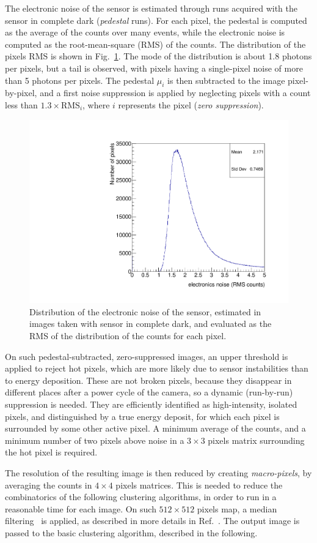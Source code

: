 The electronic noise of the sensor is estimated through runs acquired
with the sensor in complete dark ({\it pedestal} runs). For each
pixel, the pedestal is computed as the average of the counts over many
events, while the electronic noise is computed as the root-mean-square
(RMS) of the counts. The distribution of the pixels RMS is shown in
Fig.~\ref{fig:noise}. The mode of the distribution is about 1.8
photons per pixels, but a tail is observed, with pixels having a
single-pixel noise of more than 5 photons per pixels.
The pedestal $\mu_i$ is then subtracted to the image pixel-by-pixel,
and a first noise suppression is applied by neglecting pixels with a
count less than $1.3\times\textrm{RMS}_i$, where $i$ represents the
pixel (\textit{zero suppression}). 
%
\begin{figure}[ht]
  \centering
  \includegraphics[width=0.45\linewidth]{figures/sensor_noise}
  \caption{Distribution of the electronic noise of the sensor,
    estimated in images taken with sensor in complete dark, and
    evaluated as the RMS of the distribution of the counts for each
    pixel.  \label{fig:noise}}
\end{figure}
%
On such pedestal-subtracted, zero-suppressed images, an upper
threshold is applied to reject hot pixels, which are more likely due
to sensor instabilities than to energy deposition. These are not
broken pixels, because they disappear in different places after a
power cycle of the camera, so a dynamic (run-by-run) suppression is
needed.  They are efficiently identified as high-intensity, isolated
pixels, and distinguished by a true energy deposit, for which each
pixel is surrounded by some other active pixel. A minimum average of
the counts, and a minimum number of two pixels above noise in a
$3\times3$ pixels matrix surrounding the hot pixel is required.

The resolution of the resulting image is then reduced by creating
\textit{macro-pixels}, by averaging the counts in $4\times4$ pixels
matrices. This is needed to reduce the combinatorics of the following
clustering algorithms, in order to run in a reasonable time for each
image. On such $512\times512$ pixels map, a median
filtering~\cite{medianfilter} is applied, as described in more details
in Ref.~\cite{medianfilter_cygno}. The output image is passed to the
basic clustering algorithm, described in the following.


